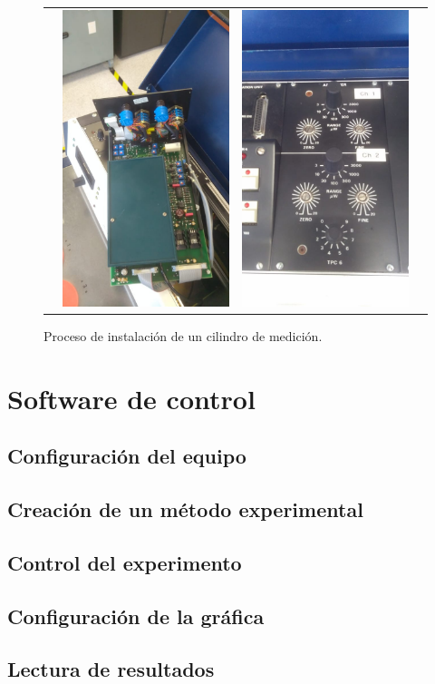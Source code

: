\begin{figure}[h]
\begin{tabular}{cccc}
			& 
			\includegraphics[width=0.24\linewidth]{Figures/process/p3} &
			\includegraphics[width=0.24\linewidth]{Figures/process/p4} &
		\end{tabular}
		\caption{Proceso de instalación de un cilindro de medición.}
		\label{fig: instalationMultiple}
	\end{figure}

	
	
	\section{Software de control}
	\subsection{Configuración del equipo}
	\subsection{Creación de un método experimental}
	\subsection{Control del experimento}
	\subsection{Configuración de la gráfica}
	\subsection{Lectura de resultados}

